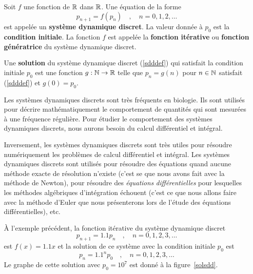 {\begin{focus}{\dfn}
Soit $f$ une fonction de $\mathbb{R}$ dans $\mathbb{R}$.  Une équation de la forme
\begin{equation} \label{sdddef}
p_{n+1} = f(p_n) \quad , \quad n=0, 1, 2, \ldots
\end{equation}
est appelée un {\bfseries système dynamique discret}.
  La valeur donnée à $p_0$ est la
{\bfseries condition initiale}.
  La fonction $f$
est appelée la {\bfseries fonction itérative} ou
{\bfseries fonction génératrice} du système dynamique
discret.

Une {\bfseries solution} du système dynamique discret (\ref{sdddef})
qui satisfait la condition initiale $p_0$ est une fonction
$g:\mathbb{N} \rightarrow \mathbb{R}$ telle que $p_n = g(n)$ pour $n\in \mathbb{N}$
satisfait (\ref{sdddef}) et $g(0) = p_0$.
\end{focus}

\begin{rmk}
Les systèmes dynamiques discrets sont très fréquents en biologie.  Ils
sont utilisés pour décrire mathématiquement le comportement de
quantités qui sont mesurées à une fréquence régulière.  Pour étudier
le comportement des systèmes dynamiques discrets, nous aurons besoin du
calcul différentiel et intégral.

Inversement, les systèmes dynamiques discrets sont très utiles pour
résoudre numéri\-que\-ment les problèmes de calcul différentiel et
intégral.  Les systèmes dynamiques discrets sont utilisés pour
résoudre des équations quand aucune méthode exacte de résolution
n'existe (c'est se que nous avons fait avec la méthode de Newton),
pour résoudre des {\em équations différentielles} pour lesquelles les
méthodes algébriques d'intégration échouent (c'est ce que nous allons
faire avec la méthode d'Euler que nous présenterons
lors de l'étude des équations différentielles), etc.
\end{rmk}

\begin{egg}
À l'exemple précédent, la fonction itérative du système dynamique
discret
\[
p_{n+1} = 1.1 p_n \quad , \quad n=0,1,2,3,\ldots
\]
est $f(x) = 1.1x$ et la solution de ce système avec la condition
initiale $p_0$ est
\[
p_n = 1.1^n p_0 \quad , \quad n=0,1,2,3,\ldots 
\]
Le graphe de cette solution avec $p_0 = 10^7$ est donné à la
figure~\ref{solsdd}.
\end{egg}

}
